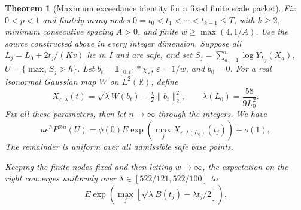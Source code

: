 \documentclass[a4paper,11pt]{article}
\newtheorem{theorem}{Theorem}
\theoremstyle{remark}
\begin{document}
\begin{theorem}[Maximum exceedance identity for a fixed finite scale packet]\label{thm:paperwinner}
Fix $0<p<1$ and finitely many nodes $0=t_0<t_1<\cdots<t_{k-1}\le T$, with $k\ge2$,
minimum consecutive spacing $A>0$, and finite $w\ge\max(4,1/A)$.
Use the source constructed above in every integer dimension. Suppose all $L_j=L_0+2t_j/(Kv)$ lie in $I$ and are safe, and set
$S_j=\sum_{a=1}^n\log Y_{L_j}(X_a)$, $U=\{\max_jS_j>h\}$.
Let $b_t=\mathbf1_{[0,t]}*\chi_\varepsilon$, $\varepsilon=1/w$, and $b_0=0$.
For a real isonormal Gaussian map $W$ on $L^2(\mathbb R)$, define
\[
 X_{\varepsilon,\lambda}(t)=\sqrt\lambda W(b_t)-\tfrac\lambda2\|b_t\|_2^2,
 \qquad\lambda(L_0)=\frac{58}{9L_0^2}.
\]
Fix all these parameters, then let $n\to\infty$ through the integers. We have
\begin{equation}\label{eq:paperwinner}
 ue^hP^{\otimes n}(U)=\phi(0)E\exp(\max_jX_{\varepsilon,\lambda(L_0)}(t_j))+o(1),
\end{equation}
The remainder is uniform over all admissible safe base points.
\par Keeping the finite nodes fixed and then letting $w\to\infty$, the expectation on the right converges
uniformly over $\lambda\in[522/121,522/100]$ to
\[ E\exp(\max_j[\sqrt\lambda B(t_j)-\lambda t_j/2]).\]
\end{theorem}
\end{document}
